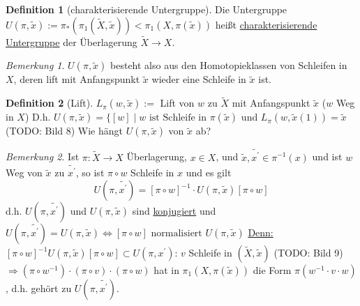 \documentclass[a4paper,11pt,notitlepage]{report}
\theoremstyle{remark}
\newtheorem{remark}{Bemerkung}[chapter]
\theoremstyle{definition}
\newtheorem{definition}{Definition}[chapter]
\begin{document}
\begin{definition}[charakterisierende Untergruppe]
	Die Untergruppe $U(\pi, \widetilde{x}) := \pi_*(\pi_1(\widetilde{X}, \widetilde{x})) < \pi_1(X, \pi(\widetilde{x}))$ heißt \underline{charakterisierende Untergruppe} der Überlagerung $\widetilde{X} \rightarrow X$.
\end{definition}

\begin{remark}
	$U(\pi, \widetilde{x})$ besteht also aus den Homotopieklassen von Schleifen in $X$, deren lift mit Anfangspunkt $\widetilde{x}$ wieder eine Schleife in $\widetilde{x}$ ist.
\end{remark}

\begin{definition}[Lift]
	$L_{\pi}(w, \widetilde{x}):=$ Lift von $w$ zu $\widetilde{X}$ mit Anfangspunkt $\widetilde{x}$ ($w$ Weg in $X$)
	\newline
	D.h. $U(\pi, \widetilde{x}) = \{[w] \mid \text{$w$ ist Schleife in $\pi(\widetilde{x})$ und $L_\pi(w, \widetilde{x}(1)) = \widetilde{x}$}$
	(TODO: Bild 8)
	Wie hängt $U(\pi, \widetilde{x})$ von $\widetilde{x}$ ab?
\end{definition}

\begin{remark}
	Ist $\pi \colon \widetilde{X} \rightarrow X$ Überlagerung, $x \in X$, und $\widetilde{x}, \widetilde{x^\prime} \in \pi^{-1}(x)$ und ist $w$ Weg von $\widetilde{x}$ zu $\widetilde{x^\prime}$, so ist $\pi \circ w$ Schleife in $x$ und es gilt
	$$U(\pi, \widetilde{x^\prime}) = [\pi \circ w]^{-1} \cdot U(\pi, \widetilde{x})[\pi \circ w]$$
	d.h. $U(\pi, \widetilde{x^\prime})$ und $U(\pi, \widetilde{x})$ sind \underline{konjugiert} und \newline $U(\pi, \widetilde{x^\prime}) = U(\pi, \widetilde{x}) \Leftrightarrow [\pi \circ w] \text{ normalisiert } U(\pi, \widetilde{x})$
	\newline
	\underline{Denn:} $[\pi \circ w]^{-1} U(\pi, \widetilde{x}) [\pi \circ w] \subset U(\pi, x^\prime)$: $v$ Schleife in $(\widetilde{X}, \widetilde{x})$ (TODO: Bild 9)
	\newline
	$\Rightarrow (\pi \circ w^{-1}) \cdot (\pi \circ v) \cdot (\pi \circ w)$ hat in $\pi_1(X, \pi(\widetilde{x}))$ die Form $\pi(w^{-1} \cdot v \cdot w)$, d.h. gehört zu $U(\pi, \widetilde{x^\prime})$.
\end{remark}
\end{document}
